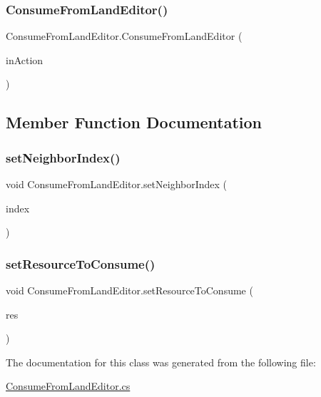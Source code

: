 \subsubsection{\texorpdfstring{Consume\+From\+Land\+Editor()}{ConsumeFromLandEditor()}}
{\footnotesize\ttfamily Consume\+From\+Land\+Editor.\+Consume\+From\+Land\+Editor (\begin{DoxyParamCaption}\item[{\mbox{\hyperlink{class_consume_from_land}{Consume\+From\+Land}}}]{in\+Action }\end{DoxyParamCaption})}



\subsection{Member Function Documentation}
\mbox{\label{class_consume_from_land_editor_a8c3ecdabdf02fc94888ed16665f0850c}} 
\subsubsection{\texorpdfstring{set\+Neighbor\+Index()}{setNeighborIndex()}}
{\footnotesize\ttfamily void Consume\+From\+Land\+Editor.\+set\+Neighbor\+Index (\begin{DoxyParamCaption}\item[{int}]{index }\end{DoxyParamCaption})}

\mbox{\label{class_consume_from_land_editor_a656aefcc2ccf0562992d48a59c8148de}} 
\subsubsection{\texorpdfstring{set\+Resource\+To\+Consume()}{setResourceToConsume()}}
{\footnotesize\ttfamily void Consume\+From\+Land\+Editor.\+set\+Resource\+To\+Consume (\begin{DoxyParamCaption}\item[{string}]{res }\end{DoxyParamCaption})}



The documentation for this class was generated from the following file\+:\begin{DoxyCompactItemize}
\item 
\mbox{\hyperlink{_consume_from_land_editor_8cs}{Consume\+From\+Land\+Editor.\+cs}}\end{DoxyCompactItemize}
